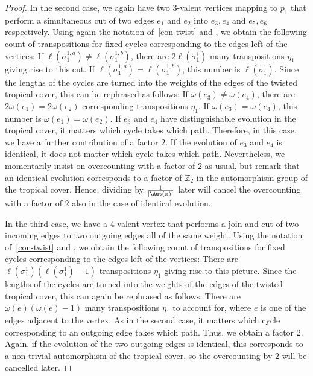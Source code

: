 \begin{proof}
In the second case, we again have two $3$-valent vertices mapping to $p_1$ that perform a simultaneous cut of two edges $e_1$ and $e_2$ into $e_3,e_4$ and $e_5,e_6$ respectively.  Using again the notation of~\cref{con-twist} and \cite[Theorem 2.12]{BF21}, we obtain the following count of transpositions for fixed cycles corresponding to the edges left of the vertices: If $\ell(\sigma_1^{1,a})\neq\ell(\sigma_1^{1,b})$, there are $2\ell(\sigma_1^1)$ many transpositions $\eta_1$ giving rise to this cut. If $\ell(\sigma_1^{1,a})=\ell(\sigma_1^{1,b})$, this number is $\ell(\sigma_1^1)$.
    Since the lengths of the cycles are turned into the weights of the edges of the twisted tropical cover, this can be rephrased as follows:    If $\omega(e_3)\neq\omega(e_4)$, there are $2\omega(e_1)=2\omega(e_2)$ corresponding transpositions $\eta_1$. If $\omega(e_3)=\omega(e_4)$, this number is $\omega(e_1)=\omega(e_2)$. If $e_3$ and $e_4$ have distinguishable evolution in the tropical cover, it matters which cycle takes which path. Therefore, in this case, we have a further contribution of a factor $2$. If the evolution of $e_3$ and $e_4$ is identical, it does not matter which cycle takes which path. Nevertheless, we momentarily insist on overcounting with a factor of $2$ as usual, but remark that an identical evolution     corresponds to a factor of $\mathbb{Z}_2$ in the automorphism group of the tropical cover. Hence, dividing by $\frac{1}{|\Aut(\pi)|}$ later will cancel the overcounting with a factor of $2$ also in the case of identical evolution.
    
In the third case, we have a $4$-valent vertex that performs a join and cut of two incoming edges to two outgoing edges all of the same weight. Using the notation of~\cref{con-twist} and \cite[Theorem 2.12]{BF21}, we obtain the following count of transpositions for fixed cycles corresponding to the edges left of the vertices:
There are $\ell(\sigma_1^1)(\ell(\sigma_1^1)-1)$ transpositions $\eta_1$ giving rise to this picture. Since the lengths of the cycles are turned into the weights of the edges of the twisted tropical cover, this can again be rephrased as follows:
There are $\omega(e)(\omega(e)-1)$ many transpositions $\eta_1$ to account for, where $e$ is one of the edges adjacent to the vertex. As in the second case, it matters which cycle corresponding to an outgoing edge takes which path. Thus, we obtain a factor $2$. Again, if the evolution of the two outgoing edges is identical, this corresponds to a non-trivial automorphism of the tropical cover, so the overcounting by $2$ will be cancelled later.


\end{proof}
